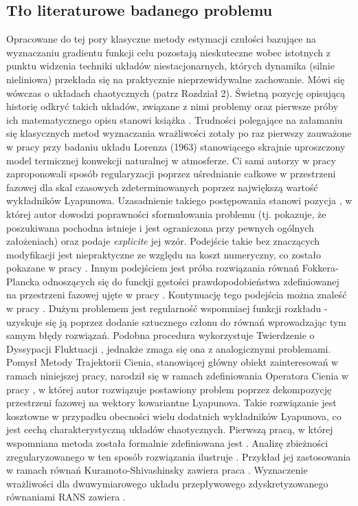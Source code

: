 \documentclass[12pt]{article}
\begin{document}
\subsection{Tło literaturowe badanego problemu}
Opracowane do tej pory klasyczne metody estymacji czułości bazujące na wyznaczaniu gradientu funkcji celu pozostają nieskuteczne wobec istotnych z punktu widzenia techniki układów niestacjonarnych, których dynamika (silnie nieliniowa) przekłada się na praktycznie nieprzewidywalne zachowanie. Mówi się wówczas o układach chaotycznych (patrz Rozdział 2). Świetną pozycję opisującą historię odkryć takich układów, związane z nimi problemy oraz pierwsze próby ich matematycznego opisu stanowi książka \cite{Gleick}. Trudności polegające na załamaniu się klasycznych metod wyznaczania wrażliwości zotały po raz pierwszy zauważone w pracy \cite{Lea1} przy badaniu układu Lorenza (1963) stanowiącego skrajnie uproszczony model termicznej konwekcji naturalnej w atmosferze. Ci sami autorzy w pracy \cite{Lea2} zaproponowali sposób regularyzacji poprzez uśrednianie całkowe w przestrzeni fazowej dla skal czasowych zdeterminowanych poprzez największą wartość wykładników Lyapunowa. Uzasadnienie takiego postępowania stanowi pozycja \cite{Ruelle1}, w której autor dowodzi poprawności sformułowania problemu (tj. pokazuje, że poszukiwana pochodna istnieje i jest ograniczona przy pewnych ogólnych założeniach) oraz podaje \textit{explicite} jej wzór. Podejście takie bez znaczących modyfikacji jest niepraktyczne ze względu na koszt numeryczny, co zostało pokazane w pracy \cite{Chandramoorthy}.\newline
Innym podejściem jest próba rozwiązania równań Fokkera-Plancka odnoszących się do funckji gęstości prawdopodobieństwa zdefiniowanej na przestrzeni fazowej ujęte w pracy \cite{Thuburn}. Kontynuację tego podejścia można znaleść w pracy \cite{Blonigan1}. Dużym problemem jest regularność wspomniaej funkcji rozkładu - uzyskuje się ją poprzez dodanie sztucznego członu do równań wprowadzając tym samym błędy rozwiązań. Podobna procedura wykorzystuje Twierdzenie o Dyssypacji Fluktuacji \cite{Abramov}, jednakże zmaga się ona z analogicznymi problemami.\newline
Pomysł Metody Trajektorii Cienia, stanowiącej główny obiekt zainteresowań w ramach niniejszej pracy, narodził się w ramach zdefiniowania Operatora Cienia w pracy \cite{Qiqi1}, w której autor rozwiązuje postawiony problem poprzez dekompozycję przestrzeni fazowej na wektory kowariantne Lyapunova. Takie rozwiązanie jest kosztowne w przypadku obecności wielu dodatnich wykładników Lyapunova, co jest cechą charakterystyczną układów chaotycznych. Pierwszą pracą, w której wspomniana metoda została formalnie zdefiniowana jest \cite{Qiqi3}. Analizę zbieżności zregularyzowanego w ten sposób rozwiązania ilustruje \cite{Qiqi2}. Przykład jej zastosowania w ramach równań Kuramoto-Shivashinsky zawiera praca \cite{Blonigan3}. Wyznaczenie wrażliwości dla dwuwymiarowego układu przepływowego zdyskretyzowanego równaniami RANS zawiera \cite{Blonigan2}.
\end{document}
